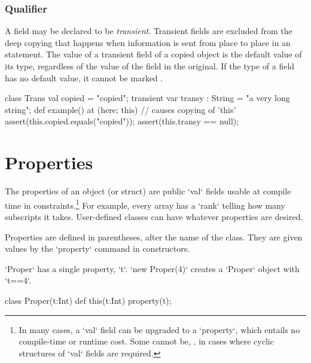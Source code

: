 \subsubsection{ Qualifier}
\label{TransientFields}

A field may be declared to be {\em transient}.  Transient fields are excluded
from the deep copying that happens when information is sent from place to
place in an  statement.    The value of a transient field of a copied
object is the default value of its type, regardless of the value of the field
in the original.  If the type of a field has no
default value, it cannot be marked .
\begin{xten}
class Trans { 
   val copied = "copied";
   transient var transy : String = "a very long string";
   def example() {
      at (here; this) { // causes copying of 'this'
         assert(this.copied.equals("copied"));
         assert(this.transy == null);
      }
   }
}
\end{xten}


\section{Properties}
\label{PropertiesInClasses}

The properties of an object (or struct) are  public \xcd`val` fields
usable at compile time in constraints.\footnote{In many cases, a 
\xcd`val` field can be upgraded to a \xcd`property`, which 
entails no compile-time or runtime cost.  Some cannot be, \eg, in cases where
cyclic structures of \xcd`val` fields are required.} 
For example,  every array has a \xcd`rank` telling
how many subscripts it takes.  User-defined classes can have whatever
properties are desired. 

Properties are defined in parentheses, after the name of the class.  They are
given values by the \xcd`property` command in constructors.

\begin{ex}
\xcd`Proper` has a single property, \xcd`t`.  \xcd`new Proper(4)` creates a
\xcd`Proper` object with \xcd`t==4`. 
\begin{xten}
class Proper(t:Int) {
  def this(t:Int) {property(t);}
}
\end{xten}

\end{ex}



